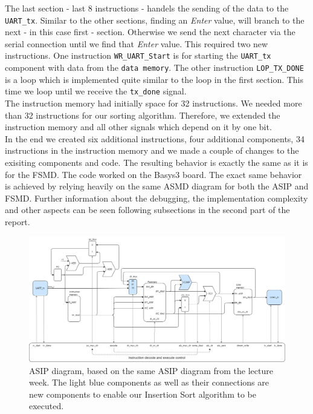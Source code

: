 \documentclass[conference]{IEEEtran}
\begin{document}
The last section - last 8 instructions - handels the sending of the data to the \texttt{UART\_tx}. Similar to the other sections, finding an \textit{Enter} value, will branch to the next - in this case first - section. Otherwise we send the next character via the serial connection until we find that \textit{Enter} value. This required two new instructions. One instruction \texttt{WR\_UART\_Start} is for starting the \texttt{UART\_tx} component with data from the \texttt{data memory}. The other instruction \texttt{LOP\_TX\_DONE} is a loop which is implemented quite similar to the loop in the first section. This time we loop until we receive the \texttt{tx\_done} signal.\\
The instruction memory had initially space for 32 instructions. We needed more than 32 instructions for our sorting algorithm. Therefore, we extended the instruction memory and all other signals which depend on it by one bit. \\
In the end we created six additional instructions, four additional components, 34 instructions in the instruction memory and we made a couple of changes to the exisiting components and code. The resulting behavior is exactly the same as it is for the FSMD. The code worked on the Basys3 board. The exact same behavior is achieved by relying heavily on the same ASMD diagram for both the ASIP and FSMD. Further information about the debugging, the implementation complexity and other aspects can be seen following subsections in the second part of the report. \\

\begin{figure}
    \centering
    \includegraphics[width=1\linewidth]{Images/ASIP.png}
    \caption{ASIP diagram, based on the same ASIP diagram from the lecture week. The light blue components as well as their connections are new components to enable our Insertion Sort algorithm to be executed.}
    \label{fig:asip}
\end{figure}
\end{document}
